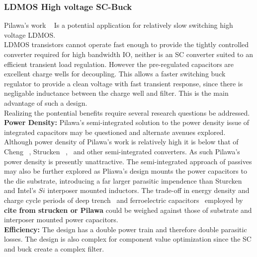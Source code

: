 \documentclass[letterpaper,twocolumn,10pt]{article}
\begin{document}
\subsubsection{LDMOS High voltage SC-Buck}
Pilawa's work ~\cite{Pilawa2012} Is a potential application for relatively slow switching high voltage LDMOS.\\
LDMOS transistors cannot operate fast enough to provide the tightly controlled converter required for high bandwidth IO, neither is an SC converter suited to an efficient transient load regulation. However the pre-regulated capacitors are excellent charge wells for decoupling. This allows a faster switching buck regulator to provide a clean voltage with fast transient response, since there is negligable inductance between the charge well and filter. This is the main advantage of such a design.\\
Realizing the pontential benefits require several research questions be addressed.\\
\textbf{Power Density: }Pilawa's semi-integrated solution to the power density issue of integrated capacitors may be questioned and alternate avenues explored. Although power density of Pilawa's work is relatively high it is below that of Cheng ~\cite{Cheng2013}, Strucken ~\cite{Sturcken2012},~\cite{Sturcken2013} and other semi-integrated converters. As such Pilawa's power density is presently unattractive. The semi-integrated approach of passives may also be further explored as Pliawa's design mounts the power capacitors to the die substrate, introducing a far larger parasitic impendence than Sturcken and Intel's $Si$ interposer mounted inductors. The trade-off in energy density and charge cycle periods of deep trench~\cite{Pique} and ferroelectric capacitors~\cite{Damak2013} employed by \textbf{cite from strucken or Pilawa} could be weighed against those of substrate and interposer mounted power capacitors.\\   
\textbf{Efficiency: }The design has a double power train and therefore double parasitic losses. The design is also complex for component value optimization since the SC and buck create a complex filter.\\  
\end{document}
